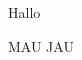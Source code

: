 \documentclass[Dokumentation,nolistings,noruntimes,noboxes,noinfoboxes,nographics,nopresenter]{Lilly}
\begin{document}
Hallo

\makeatletter
\ifLILLY@listings
MAU
\else
JAU
\fi
\end{document}
